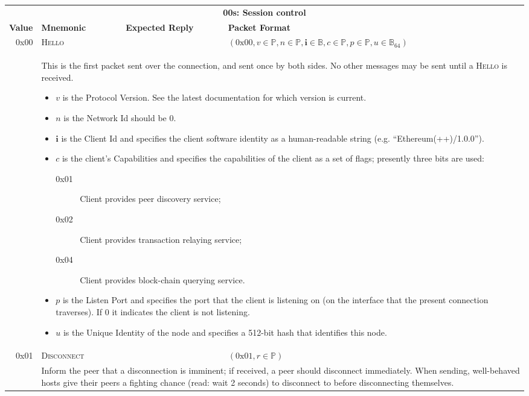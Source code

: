 \documentclass[9pt,oneside]{amsart}
\begin{document}
\begin{tabular*}{\columnwidth}[h]{rlll}
\toprule
\multicolumn{4}{c}{\textbf{00s: Session control}} \vspace{5pt} \\
\textbf{Value} & \textbf{Mnemonic} & \textbf{Expected Reply} & \textbf{Packet Format} \vspace{5pt} \\
0x00 & \textsc{Hello} & & $(\text{0x}00, v \in \mathbb{P}, n \in \mathbb{P}, \mathbf{i} \in \mathbb{B}, c \in \mathbb{P}, p \in \mathbb{P}, u \in \mathbb{B}_{64})$ \\
& \multicolumn{3}{p{0.8\columnwidth}}{
This is the first packet sent over the connection, and sent once by both sides. No other messages may be sent until a \textsc{Hello} is received.
\begin{itemize}
\item $v$ is the Protocol Version. See the latest documentation for which version is current.
\item $n$ is the Network Id should be 0.
\item $\mathbf{i}$ is the Client Id and specifies the client software identity as a human-readable string (e.g. ``Ethereum(++)/1.0.0'').
\item $c$ is the client's Capabilities and specifies the capabilities of the client as a set of flags; presently three bits are used:
\begin{description}
\item[0x01] Client provides peer discovery service;
\item[0x02] Client provides transaction relaying service;
\item[0x04] Client provides block-chain querying service.
\end{description}
\item $p$ is the Listen Port and specifies the port that the client is listening on (on the interface that the present connection traverses). If 0 it indicates the client is not listening.
\item $u$ is the Unique Identity of the node and specifies a 512-bit hash that identifies this node.
\end{itemize}
}\\
\midrule
0x01 & \textsc{Disconnect} && $(\text{0x}01, r \in \mathbb{P})$ \\
& \multicolumn{3}{p{0.8\columnwidth}}{
Inform the peer that a disconnection is imminent; if received, a peer should disconnect immediately. When sending, well-behaved hosts give their peers a fighting chance (read: wait 2 seconds) to disconnect to before disconnecting themselves.
}
\end{tabular*}
\end{document}
